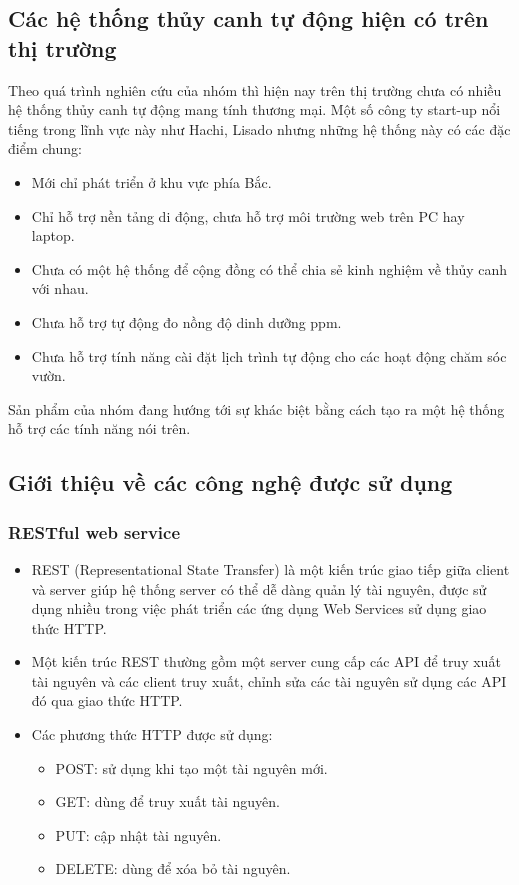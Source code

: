 \documentclass[a4paper,12pt,oneside]{article}
\begin{document}
\subsection{Các hệ thống thủy canh tự động hiện có trên thị trường}
\noindent Theo quá trình nghiên cứu của nhóm thì hiện nay trên thị trường chưa có nhiều hệ thống thủy canh tự động mang tính thương mại. Một số công ty start-up nổi tiếng trong lĩnh vực này như Hachi, Lisado nhưng những hệ thống này có các đặc điểm chung:
	\begin{itemize}
		\item Mới chỉ phát triển ở khu vực phía Bắc.
		\item Chỉ hỗ trợ nền tảng di động, chưa hỗ trợ môi trường web trên PC hay laptop.
		\item Chưa có một hệ thống để cộng đồng có thể chia sẻ kinh nghiệm về thủy canh với nhau.
		\item Chưa hỗ trợ tự động đo nồng độ dinh dưỡng ppm.
		\item Chưa hỗ trợ tính năng cài đặt lịch trình tự động cho các hoạt động chăm sóc vườn.
	\end{itemize} 
\noindent Sản phẩm của nhóm đang hướng tới sự khác biệt bằng cách tạo ra một hệ thống hỗ trợ các tính năng nói trên.
\subsection{Giới thiệu về các công nghệ được sử dụng}

\subsubsection{RESTful web service \cite{restful}}
\begin{itemize}
\item REST (Representational State Transfer) là một kiến trúc giao tiếp giữa client và server giúp hệ thống server có thể dễ dàng quản lý tài nguyên, được sử dụng nhiều trong việc phát triển các ứng dụng Web Services sử dụng giao thức HTTP.
\item Một kiến trúc REST thường gồm một server cung cấp các API để truy xuất tài nguyên và các client truy xuất, chỉnh sửa các tài nguyên sử dụng các API đó qua giao thức HTTP.
\item Các phương thức HTTP được sử dụng:
\begin{itemize}
\item POST: sử dụng khi tạo một tài nguyên mới.
\item GET: dùng để truy xuất tài nguyên.
\item PUT: cập nhật tài nguyên.
\item DELETE: dùng để xóa bỏ tài nguyên.
\end{itemize}
\end{itemize}
\end{document}
